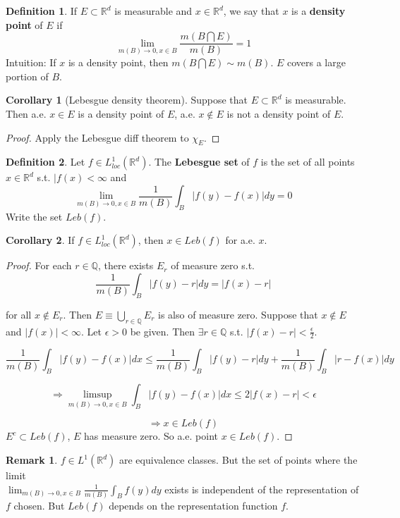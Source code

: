 \documentclass{article}
\theoremstyle{definition}
\newtheorem{dfn}{Definition}
\newtheorem{rem}{Remark}
\newtheorem{cor}{Corollary}
\begin{document}
\begin{dfn}
	If $E \subset \mathbb{R}^d$ is measurable and $x \in \mathbb{R}^d$, we say that $x$ is a \textbf{density point} of $E$ if 
  $$\lim_{m(B) \to 0, x \in B} \frac{m(B \bigcap E)}{m(B)} = 1$$
  Intuition: If $x$ is a density point, then $m(B \bigcap E) \sim m(B)$. $E$ covers a large portion of $B$. 
  \begin{cor}[Lebesgue density theorem] 
    Suppose that $E \subset \mathbb{R}^d$ is measurable. Then a.e. $x \in E$ is a density point of $E$, a.e. $x \notin E$ is not a density point of $E$. 
  \end{cor}
\end{dfn}
  \begin{proof}
    Apply the Lebesgue diff theorem to $\chi_E$.
  \end{proof}
\begin{dfn}
	Let $f \in L_{loc}^1 (\mathbb{R}^d)$. The \textbf{Lebesgue set} of $f$ is the set of all points $x \in \mathbb{R}^d$ s.t. $|f(x) < \infty$ and 
  $$\lim_{m(B) \to 0, x \in B} \frac{1}{m(B)} \int_{B} |f(y) - f(x)| dy = 0$$
  Write the set $Leb(f)$. 
\end{dfn}
\begin{cor}
  If $f \in L_{loc}^1 (\mathbb{R}^d)$, then $x \in Leb(f)$ for a.e. $x$.
\end{cor}
\begin{proof}
  For each $r \in \mathbb{Q}$, there exists $E_r$ of measure zero s.t. 
  $$\frac{1}{m(B)} \int_B |f(y) - r| dy = |f(x) - r|$$

  for all $x \notin E_r$. Then $E \equiv \bigcup_{r \in \mathbb{Q}} E_r$ is also of measure zero. Suppose that $x \notin E$ and $|f(x)| < \infty$. Let $\epsilon > 0$ be given. Then $\exists r \in \mathbb{Q}$ s.t. $|f(x) - r| < \frac{\epsilon}{2}$. 

  $$\frac{1}{m(B)} \int_B |f(y) - f(x)| dx \leq \frac{1}{m(B)} \int_B |f(y) - r| dy + \frac{1}{m(B)} \int_B |r - f(x)| dy $$

  $$\Rightarrow \limsup_{m(B) \to 0, x \in B} \int_B |f(y) - f(x)| dx \leq 2 |f(x) - r| < \epsilon$$

  $$\Rightarrow x \in Leb(f)$$ 
  $E^c \subset Leb(f)$, $E$ has measure zero. So a.e. point $x \in Leb(f)$. 
\end{proof}
\begin{rem}
  $f \in L^1(\mathbb{R}^d) $ are equivalence classes. But the set of points where the limit\\ 
  $\lim_{m(B) \to 0, x \in B} \frac{1}{m(B)} \int_B f(y) dy$ exists is independent of the representation of $f$ chosen. But $Leb(f)$ depends on the representation function $f$. 
\end{rem}
\end{document}
